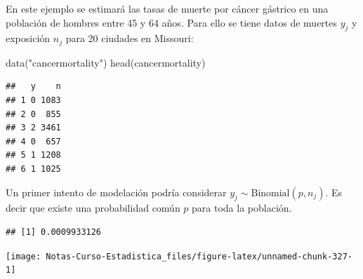\documentclass[
  12pt,
]{book}
\newenvironment{Shaded}{\begin{snugshade}}{\end{snugshade}}
\newcommand{\FunctionTok}[1]{\textcolor[rgb]{0.00,0.00,0.00}{#1}}
\newcommand{\NormalTok}[1]{#1}
\newcommand{\OtherTok}[1]{\textcolor[rgb]{0.56,0.35,0.01}{#1}}
\newcommand{\SpecialCharTok}[1]{\textcolor[rgb]{0.00,0.00,0.00}{#1}}
\newcommand{\StringTok}[1]{\textcolor[rgb]{0.31,0.60,0.02}{#1}}
\theoremstyle{definition}
\theoremstyle{definition}
\theoremstyle{definition}
\theoremstyle{definition}
\theoremstyle{remark}
\begin{document}
En este ejemplo se estimará las tasas de muerte por cáncer gástrico en una población de hombres entre 45 y 64 años. Para ello se tiene datos de muertes \(y_j\) y exposición \(n_j\) para 20 ciudades en Missouri:

\begin{Shaded}
\begin{Highlighting}[]
\FunctionTok{data}\NormalTok{(}\StringTok{"cancermortality"}\NormalTok{)}
\FunctionTok{head}\NormalTok{(cancermortality)}
\end{Highlighting}
\end{Shaded}

\begin{verbatim}
##   y    n
## 1 0 1083
## 2 0  855
## 3 2 3461
## 4 0  657
## 5 1 1208
## 6 1 1025
\end{verbatim}

Un primer intento de modelación podría considerar \(y_j\sim \text{Binomial}(p,n_j)\). Es decir que existe una probabilidad común \(p\) para toda la población.

\begin{Shaded}
\end{Shaded}

\begin{verbatim}
## [1] 0.0009933126
\end{verbatim}

\begin{Shaded}
\end{Shaded}

\begin{center}\texttt{[image: Notas-Curso-Estadistica\_files/figure-latex/unnamed-chunk-327-1]} \end{center}

\begin{Shaded}
\end{Shaded}
\end{document}
